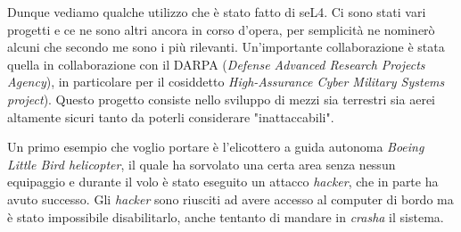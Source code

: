 Dunque vediamo qualche utilizzo che è stato fatto di seL4. Ci sono stati vari progetti e ce ne sono altri ancora in corso d'opera, per semplicità ne nominerò alcuni che secondo me sono i più rilevanti. Un'importante collaborazione è stata quella in collaborazione con il DARPA (\textit{Defense Advanced Research Projects Agency}), in particolare per il cosiddetto \textit{High-Assurance Cyber Military Systems project}). Questo progetto consiste nello sviluppo di mezzi sia terrestri sia aerei altamente sicuri tanto da poterli considerare "inattaccabili".

Un primo esempio che voglio portare è l'elicottero a guida autonoma \textit{Boeing Little Bird helicopter}, il quale ha sorvolato una certa area senza nessun equipaggio e durante il volo è stato eseguito un attacco \textit{hacker}, che in parte ha avuto successo. Gli \textit{hacker} sono riusciti ad avere accesso al computer di bordo ma è stato impossibile disabilitarlo, anche tentanto di mandare in \textit{crasha} il sistema.




